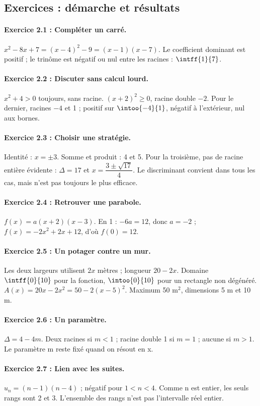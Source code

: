 \subsection*{Exercices : démarche et résultats}
\paragraph{Exercice 2.1 : Compléter un carré.} $x^2-8x+7=(x-4)^2-9=(x-1)(x-7)$. Le coefficient dominant est positif ; le trinôme est négatif ou nul entre les racines : $\intff{1}{7}$.
\paragraph{Exercice 2.2 : Discuter sans calcul lourd.} $x^2+4>0$ toujours, sans racine. $(x+2)^2\geq0$, racine double $-2$. Pour le dernier, racines $-4$ et 1 ; positif sur $\intoo{-4}{1}$, négatif à l’extérieur, nul aux bornes.
\paragraph{Exercice 2.3 : Choisir une stratégie.} Identité : $x=\pm3$. Somme et produit : 4 et 5. Pour la troisième, pas de racine entière évidente : $\Delta=17$ et $x=\dfrac{3\pm\sqrt{17}}{4}$. Le discriminant convient dans tous les cas, mais n’est pas toujours le plus efficace.
\paragraph{Exercice 2.4 : Retrouver une parabole.} $f(x)=a(x+2)(x-3)$. En 1 : $-6a=12$, donc $a=-2$ ; $f(x)=-2x^2+2x+12$, d’où $f(0)=12$.
\paragraph{Exercice 2.5 : Un potager contre un mur.} Les deux largeurs utilisent $2x$ mètres ; longueur $20-2x$. Domaine $\intff{0}{10}$ pour la fonction, $\intoo{0}{10}$ pour un rectangle non dégénéré. $A(x)=20x-2x^2=50-2(x-5)^2$. Maximum 50 m$^2$, dimensions 5 m et 10 m.
\paragraph{Exercice 2.6 : Un paramètre.} $\Delta=4-4m$. Deux racines si $m<1$ ; racine double 1 si $m=1$ ; aucune si $m>1$. Le paramètre m reste fixé quand on résout en x.
\paragraph{Exercice 2.7 : Lien avec les suites.} $u_n=(n-1)(n-4)$ ; négatif pour $1<n<4$. Comme n est entier, les seuls rangs sont 2 et 3. L’ensemble des rangs n’est pas l’intervalle réel entier.
